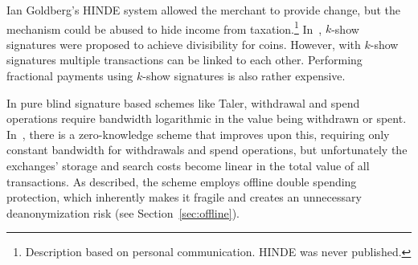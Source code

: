 \documentclass[sigconf, authordraft]{acmart}
\begin{document}
Ian Goldberg's HINDE system allowed the merchant to provide change,
but the mechanism could be abused to hide income from
taxation.\footnote{Description based on personal communication. HINDE
  was never published.}
In~\cite{brands1993efficient}, $k$-show signatures were proposed to
achieve divisibility for coins.  However, with $k$-show signatures
multiple transactions can be linked to each other.
Performing fractional payments using $k$-show signatures is also
rather expensive.

In pure blind signature based schemes like Taler, withdrawal and spend
operations require bandwidth logarithmic in the value being withdrawn
or spent.  In~\cite{Camenisch05compacte-cash}, there is a zero-knowledge
scheme that improves upon this, requiring only constant bandwidth for
withdrawals and spend operations, but unfortunately the exchanges' storage and
search costs become linear in the total value of all transactions.
As described, the scheme employs offline double spending protection,
which inherently makes it fragile and creates an unnecessary
deanonymization risk (see Section~\ref{sec:offline}).
%
%


\end{document}
